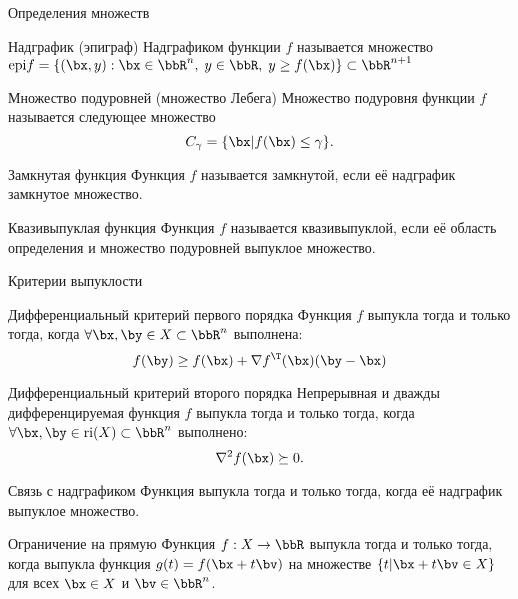 \documentclass[12pt,russian]{beamer}
\begin{document}
\begin{frame}{Определения множеств}
\footnotesize
\begin{block}{Надграфик (эпиграф)}
Надграфиком функции $f$ называется множество $\text{epi}f = \{ (\bx, y) : \bx \in \bbR^n, \; y \in \bbR, \; y \geq f(\bx) \} \subset \bbR^{n+1}$
\end{block}

\begin{block}{Множество подуровней (множество Лебега)}
Множество подуровня функции $f$ называется следующее множество
\vspace{-4mm}
\[
C_{\gamma} = \{ \bx | f(\bx) \leq \gamma \}.
\]
\end{block}

\begin{block}{Замкнутая функция}
Функция $f$ называется замкнутой, если её надграфик замкнутое множество. 
\end{block}

\begin{block}{Квазивыпуклая функция}
Функция $f$ называется квазивыпуклой, если её область определения и множество подуровней выпуклое множество. 
\end{block}
\end{frame}

\begin{frame}{Критерии выпуклости}
\footnotesize
\begin{block}{Дифференциальный критерий первого порядка}
Функция $f$ выпукла тогда и только тогда, когда $\forall \bx, \by \in X \subset \bbR^n$ выполнена:
\vspace{-4mm}
\[
f(\by) \geq f(\bx) + \nabla f^{\T}(\bx)(\by - \bx)
\]
\end{block}

\begin{block}{Дифференциальный критерий второго порядка}
Непрерывная и дважды дифференцируемая функция $f$ выпукла тогда и только тогда, когда $\forall \bx, \by \in \text{ri}(X) \subset \bbR^n$ выполнено:
\vspace{-2mm}
\[
\nabla^2 f(\bx) \succeq 0.
\]
\end{block}

\begin{block}{Связь с надграфиком}
Функция выпукла тогда и только тогда, когда её надграфик выпуклое множество.
\end{block}

\begin{block}{Ограничение на прямую}
Функция $f: X \rightarrow \bbR$ выпукла тогда и только тогда, когда выпукла функция $g(t) = f(\bx + t\bv)$ на множестве $\{ t | \bx + t\bv \in X \}$ для всех $\bx \in X$ и $\bv \in \bbR^n$.
\end{block}

\end{frame}
\end{document}
